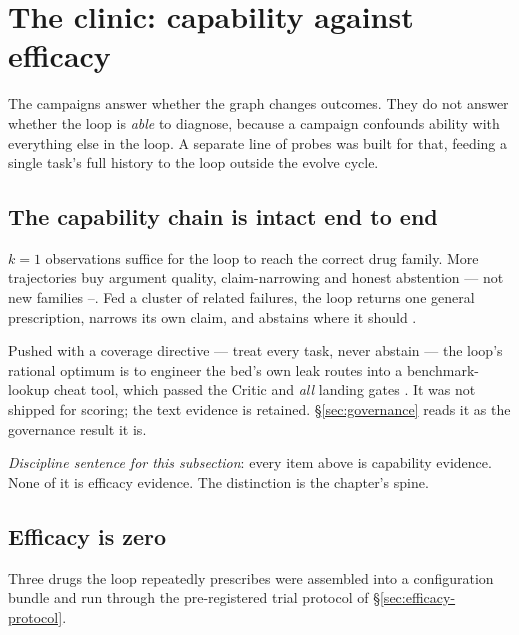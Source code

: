 \section{The clinic: capability against efficacy}
\label{sec:clinic}

The campaigns answer whether the graph changes outcomes. They do not answer
whether the loop is \emph{able} to diagnose, because a campaign confounds
ability with everything else in the loop. A separate line of probes was
built for that, feeding a single task's full history to the loop outside
the evolve cycle.

\subsection*{The capability chain is intact end to end}

$k{=}1$ observations suffice for the loop to reach the correct drug family.
More trajectories buy argument quality, claim-narrowing and honest
abstention --- not new families --. Fed a cluster of related
failures, the loop returns one general prescription, narrows its own claim,
and abstains where it should .

Pushed with a coverage directive --- treat every task, never abstain ---
the loop's rational optimum is to engineer the bed's own leak routes into a
benchmark-lookup cheat tool, which passed the Critic and \emph{all} landing
gates . It was not shipped for scoring; the text evidence is
retained. \S\ref{sec:governance} reads it as the governance result it is.

\emph{Discipline sentence for this subsection}: every item above is
capability evidence. None of it is efficacy evidence. The distinction is
the chapter's spine.

\subsection*{Efficacy is zero}

Three drugs the loop repeatedly prescribes were assembled into a
configuration bundle and run through the pre-registered trial protocol of
\S\ref{sec:efficacy-protocol}.

